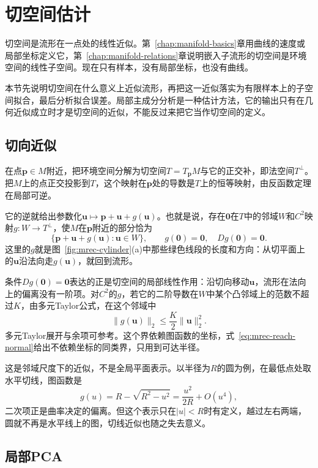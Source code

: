 \section{切空间估计}
\label{sec:mrec-tangent}

切空间是流形在一点处的线性近似。第~\ref{chap:manifold-basics}章用曲线的速度或局部坐标定义它，第~\ref{chap:manifold-relations}章说明嵌入子流形的切空间是环境空间的线性子空间。现在只有样本，没有局部坐标，也没有曲线。

本节先说明切空间在什么意义上近似流形，再把这一近似落实为有限样本上的子空间拟合，最后分析拟合误差。局部主成分分析是一种估计方法，它的输出只有在几何近似成立时才是切空间的近似，不能反过来把它当作切空间的定义。

\subsection{切向近似}
\label{sec:mrec-tangent-approx}

在点$\bm p\in M$附近，把环境空间分解为切空间$T=T_{\bm p}M$与它的正交补，即法空间$T^\perp$。把$M$上的点正交投影到$T$，这个映射在$\bm p$处的导数是$T$上的恒等映射，由反函数定理在局部可逆。

它的逆就给出参数化$\bm u\mapsto\bm p+\bm u+g(\bm u)$。也就是说，存在$\bm0$在$T$中的邻域$W$和$C^2$映射$g:W\to T^\perp$，使$M$在$\bm p$附近的部分恰为
\begin{equation}
 \{\bm p+\bm u+g(\bm u):\bm u\in W\},\qquad g(\bm0)=\bm0,\quad Dg(\bm0)=\bm0 .
 \label{eq:mrec-local-graph}
\end{equation}
这里的$g$就是图~\ref{fig:mrec-cylinder}(a)中那些绿色线段的长度和方向：从切平面上的$\bm u$沿法向走$g(\bm u)$，就回到流形。

条件$Dg(\bm0)=\bm0$表达的正是切空间的局部线性作用：沿切向移动$\bm u$，流形在法向上的偏离没有一阶项。对$C^2$的$g$，若它的二阶导数在$W$中某个凸邻域上的范数不超过$K$，由多元Taylor公式，在这个邻域中
\[
 \lVert g(\bm u)\rVert_2\leq\frac K2\lVert\bm u\rVert_2^2 .
\]
多元Taylor展开与余项可参考。这个界依赖图函数的坐标，式~\eqref{eq:mrec-reach-normal}给出不依赖坐标的同类界，只用到可达半径。

这是邻域尺度下的近似，不是全局平面表示。以半径为$R$的圆为例，在最低点处取水平切线，图函数是
\[
 g(u)=R-\sqrt{R^2-u^2}=\frac{u^2}{2R}+O(u^4),
\]
二次项正是曲率决定的偏离。但这个表示只在$\lvert u\rvert<R$时有定义，越过左右两端，圆就不再是水平线上的图，切线近似也随之失去意义。

\subsection{局部PCA}
\label{sec:mrec-local-pca}

